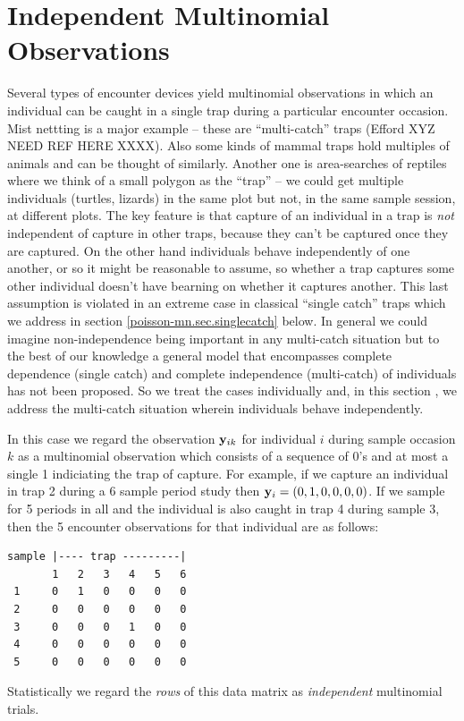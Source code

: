 {\section{Independent Multinomial Observations}

Several types of encounter devices yield multinomial observations in
which an individual can be caught in a single trap during a particular
encounter occasion.  Mist nettting is a major example -- these are
``multi-catch'' traps (Efford XYZ NEED REF HERE XXXX). Also some kinds of
mammal traps hold multiples of animals and can be thought of
similarly. Another one is area-searches of reptiles where we think of
a small polygon as the ``trap'' -- we could get multiple individuals
(turtles, lizards) in the same plot but not, in the same sample
session, at different plots.  The key feature is that capture of an
individual in a trap is {\it not} independent of capture in other
traps, because they can't be captured once they are captured. On the
other hand individuals behave independently of one another, or so it
might be reasonable to assume, so whether a trap captures some other
individual doesn't have bearning on whether it captures another.  This
last assumption is violated in an extreme case in classical ``single
catch'' traps which we address in section \ref{poisson-mn.sec.singlecatch}
below. In general we could imagine non-independence being important in
any multi-catch situation but to the best of our knowledge a general
model that encompasses complete dependence (single catch) and complete
independence (multi-catch) of individuals has not been proposed.  So
we treat the cases individually and, in this section , we address the
multi-catch situation wherein individuals behave independently.


In this case we regard the observation ${\bf y}_{ik}$ for
individual $i$ during sample occasion $k$ as a multinomial observation
which consists of a sequence of 0's and at most a single 1 indiciating
the trap of capture. For example, if we capture an individual in trap
2 during a 6 sample period study then ${\bf y}_{i} = (0,1,0,0,0,0)$.
If we sample for 5 periods in all and the individual is also caught
in trap 4 during sample 3, then the 5 encounter observations for that
individual are as follows:
\begin{verbatim}
sample |---- trap ---------|
       1   2   3   4   5   6
 1     0   1   0   0   0   0
 2     0   0   0   0   0   0
 3     0   0   0   1   0   0
 4     0   0   0   0   0   0
 5     0   0   0   0   0   0
\end{verbatim}
Statistically we regard the {\it rows} of this data matrix as {\it
  independent} multinomial trials.

}
